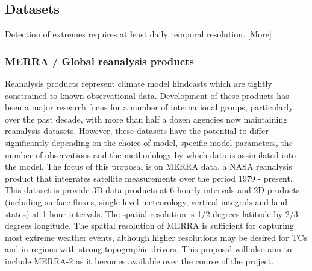 \documentclass[11pt]{article}
\begin{document}

\subsection{Datasets} \label{sec:Datasets}

Detection of extremes requires at least daily temporal resolution. {\color{red} [More]}

\subsubsection*{MERRA / Global reanalysis products} \label{sec:MERRA}

Reanalysis products represent climate model hindcasts which are tightly constrained to known observational data.  Development of these products has been a major research focus for a number of international groups, particularly over the past decade, with more than half a dozen agencies now maintaining reanalysis datasets.  However, these datasets have the potential to differ significantly depending on the choice of model, specific model parameters, the number of observations and the methodology by which data is assimilated into the model.  The focus of this proposal is on MERRA \citep{rienecker2011merra} data, a NASA reanalysis product that integrates satellite measurements over the period 1979 - present.  This dataset is provide 3D data products at 6-hourly intervals and 2D products (including surface fluxes, single level meteorology, vertical integrals and land states) at 1-hour intervals.  The spatial resolution is 1/2 degrees latitude by 2/3 degrees longitude.  The spatial resolution of MERRA is sufficient for capturing most extreme weather events, although higher resolutions may be desired for TCs and in regions with strong topographic drivers.  This proposal will also aim to include MERRA-2 as it becomes available over the course of the project.
\end{document}
